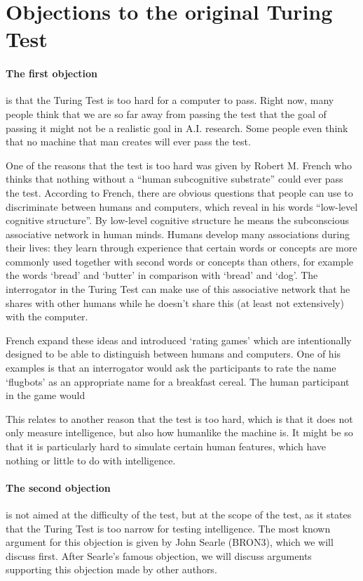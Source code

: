 \section{Objections to the original Turing Test}

\cite{sep-turing-test,another}
\paragraph{The first objection} is that the Turing Test is too hard for a computer to pass. Right now, many people think that we are so far away from passing the test that the goal of passing it might not be a realistic goal in A.I. research. Some people even think that no machine that man creates will ever pass the test.

One of the reasons that the test is too hard was given by Robert M. French who thinks that nothing without a “human subcognitive substrate” could ever pass the test. According to French, there are obvious questions that people can use to discriminate between humans and computers, which reveal in his words “low-level cognitive structure”. By low-level cognitive structure he means the subconscious associative network in human minds. Humans develop many associations during their lives: they learn through experience that certain words or concepts are more commonly used together with second words or concepts than others, for example the words ‘bread’ and ‘butter’ in comparison with ‘bread’ and ‘dog’. The interrogator in the Turing Test can make use of this associative network that he shares with other humans while he doesn’t share this (at least not extensively) with the computer.

French expand these ideas and introduced ‘rating games’ which are intentionally designed to be able to distinguish between humans and computers. One of his examples is that an interrogator would ask the participants to rate the name ‘flugbots’ as an appropriate name for a breakfast cereal. The human participant in the game would

This relates to another reason that the test is too hard, which is that it does not only measure intelligence, but also how humanlike the machine is. It might be so that it is particularly hard to simulate certain human features, which have nothing or little to do with intelligence.


\paragraph{The second objection} is not aimed at the difficulty of the test, but at the scope of the test, as it states that the Turing Test is too narrow for testing intelligence. The most known argument for this objection is given by John Searle (BRON3), which we will discuss first. After Searle’s famous objection, we will discuss arguments supporting this objection made by other authors.


